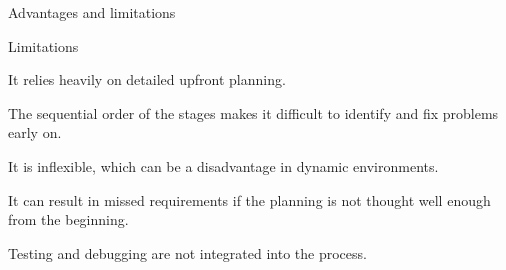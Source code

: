 \begin{frame}{Advantages and limitations}
    \begin{alertblock}{Limitations}
        \item It relies heavily on detailed upfront planning.
               
        \item The sequential order of the stages makes it difficult to identify and fix problems early on.
        
        \item It is inflexible, which can be a disadvantage in dynamic environments.
        
        \item It can result in missed requirements if the planning is not thought well enough from the beginning.
        
        \item Testing and debugging are not integrated into the process.
        
    \end{alertblock}
\end{frame}